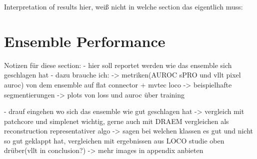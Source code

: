 Interpretation of results hier, weiß nicht in welche section das eigentlich muss:



\section{Ensemble Performance}
Notizen für diese section:
- hier soll reportet werden wie das ensemble sich geschlagen hat
- dazu brauche ich:
-> metriken(AUROC sPRO und vllt pixel auroc) von dem ensemble auf flat connector + mvtec loco
-> beispielhafte segmentierungen
-> plots von loss und auroc über training

- drauf eingehen wo sich das ensemble wie gut geschlagen hat
-> vergleich mit patchcore und simplenet wichtig, gerne auch mit DRAEM vergleichen als reconstruction representativer algo
-> sagen bei welchen klassen es gut und nicht so gut geklappt hat, vergleichen mit ergebnissen aus LOCO studie oben drüber(vllt in conclusion?)
-> mehr images in appendix anbieten





